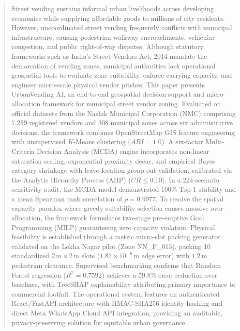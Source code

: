 \documentclass[conference]{IEEEtran}
\begin{document}
\begin{abstract}
Street vending sustains informal urban livelihoods across developing economies while supplying affordable goods to millions of city residents. However, uncoordinated street vending frequently conflicts with municipal infrastructure, causing pedestrian walkway encroachments, vehicular congestion, and public right-of-way disputes. Although statutory frameworks such as India's Street Vendors Act, 2014 mandate the demarcation of vending zones, municipal authorities lack operational geospatial tools to evaluate zone suitability, enforce carrying capacity, and engineer micro-scale physical vendor pitches. This paper presents UrbanVending AI, an end-to-end geospatial decision-support and micro-allocation framework for municipal street vendor zoning. Evaluated on official datasets from the Nashik Municipal Corporation (NMC) comprising 7,259 registered vendors and 308 municipal zones across six administrative divisions, the framework combines OpenStreetMap GIS feature engineering with unsupervised $K$-Means clustering ($ARI = 1.0$). A six-factor Multi-Criteria Decision Analysis (MCDA) engine incorporates non-linear saturation scaling, exponential proximity decay, and empirical Bayes category shrinkage with leave-location-group-out validation, calibrated via the Analytic Hierarchy Process (AHP) ($CR \le 0.10$). In a 224-scenario sensitivity audit, the MCDA model demonstrated 100\% Top-1 stability and a mean Spearman rank correlation of $\rho = 0.9977$. To resolve the spatial capacity paradox where greedy suitability selection causes massive over-allocation, the framework formulates two-stage pre-emptive Goal Programming (MILP) guaranteeing zero capacity violation. Physical feasibility is established through a metric micro-slot packing generator validated on the Lekha Nagar pilot (Zone NN\_F\_013), packing 10 standardized $2\,\text{m}\times 2\,\text{m}$ slots ($1.87 \times 10^{-9}\,\text{m}$ edge error) with $1.2\,\text{m}$ pedestrian clearance. Supervised benchmarking confirms that Random Forest regression ($R^2 = 0.7592$) achieves a 59.8\% error reduction over baselines, with TreeSHAP explainability attributing primary importance to commercial footfall. The operational system features an authenticated React/FastAPI architecture with HMAC-SHA256 identity hashing and direct Meta WhatsApp Cloud API integration, providing an auditable, privacy-preserving solution for equitable urban governance.
\end{abstract}
\end{document}
